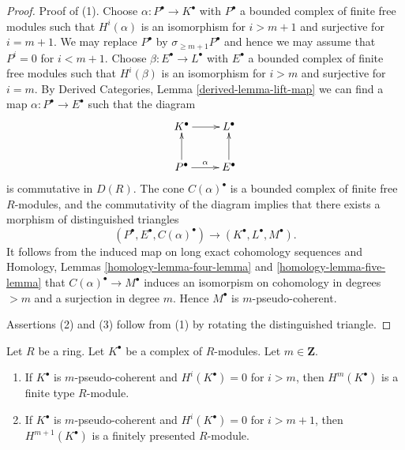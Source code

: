 \begin{proof}
Proof of (1). Choose $\alpha : P^\bullet \to K^\bullet$
with $P^\bullet$ a bounded complex of finite free modules
such that $H^i(\alpha)$ is an isomorphism for $i > m + 1$ and
surjective for $i = m + 1$. We may replace $P^\bullet$ by
$\sigma_{\geq m + 1}P^\bullet$ and hence we may assume that $P^i = 0$
for $i < m + 1$. Choose $\beta : E^\bullet \to L^\bullet$ with $E^\bullet$
a bounded complex of finite free modules such that
$H^i(\beta)$ is an isomorphism for $i > m$ and
surjective for $i = m$. By
Derived Categories,
Lemma \ref{derived-lemma-lift-map}
we can find a map $\alpha : P^\bullet \to E^\bullet$ such that the diagram
$$
\xymatrix{
K^\bullet \ar[r] & L^\bullet \\
P^\bullet \ar[u] \ar[r]^\alpha & E^\bullet \ar[u]
}
$$
is commutative in $D(R)$. The cone $C(\alpha)^\bullet$ is a bounded
complex of finite free $R$-modules, and the commutativity of the
diagram implies that there exists a morphism of distinguished triangles
$$
(P^\bullet, E^\bullet, C(\alpha)^\bullet)
\longrightarrow
(K^\bullet, L^\bullet, M^\bullet).
$$
It follows from the induced map on long exact cohomology sequences and
Homology, Lemmas \ref{homology-lemma-four-lemma} and
\ref{homology-lemma-five-lemma}
that $C(\alpha)^\bullet \to M^\bullet$ induces an isomorpism
on cohomology in degrees $> m$ and a surjection in degree $m$.
Hence $M^\bullet$ is $m$-pseudo-coherent.

\medskip\noindent
Assertions (2) and (3) follow from (1) by rotating the distinguished
triangle.
\end{proof}

\begin{lemma}
\label{lemma-finite-cohomology}
Let $R$ be a ring. Let $K^\bullet$ be a complex of $R$-modules.
Let $m \in \mathbf{Z}$.
\begin{enumerate}
\item If $K^\bullet$ is $m$-pseudo-coherent and $H^i(K^\bullet) = 0$
for $i > m$, then $H^m(K^\bullet)$ is a finite type $R$-module.
\item If $K^\bullet$ is $m$-pseudo-coherent and $H^i(K^\bullet) = 0$
for $i > m + 1$, then $H^{m + 1}(K^\bullet)$ is a finitely presented
$R$-module.
\end{enumerate}
\end{lemma}

